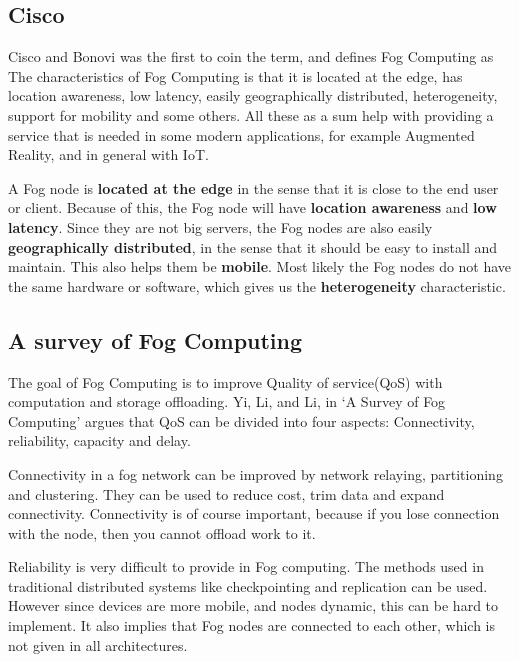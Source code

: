 \subsection{Cisco}
Cisco\cite{bonomi_fog_nodate} and Bonovi was the first to coin the term, and defines Fog Computing as   The characteristics of Fog Computing is that it is located at the edge, has location awareness, low latency, easily geographically distributed, heterogeneity, support for mobility and some others. All these as a sum help with providing a service that is needed in some modern applications, for example Augmented Reality, and in general with IoT.

A Fog node is \textbf{located at the edge} in the sense that it is close to the end user or client. Because of this, the Fog node will have \textbf{location awareness} and \textbf{low latency}. Since they are not big servers, the Fog nodes are also easily \textbf{geographically distributed}, in the sense that it should be easy to install and maintain. This also helps them be \textbf{mobile}. Most likely the Fog nodes do not have the same hardware or software, which gives us the \textbf{heterogeneity} characteristic. 

\subsection{A survey of Fog Computing}
The goal of Fog Computing is to improve Quality of service(QoS) with computation and storage offloading. Yi, Li, and Li, in ‘A Survey of Fog Computing’\cite{yi_survey_2015} argues that QoS can be divided into four aspects: Connectivity, reliability, capacity and delay.

Connectivity in a fog network can be improved by network relaying, partitioning and clustering. They can be used to reduce cost, trim data and expand connectivity. Connectivity is of course important, because if you lose connection with the node, then you cannot offload work to it. 

Reliability is very difficult to provide in Fog computing. The methods used in traditional distributed systems like checkpointing and replication can be used. However since devices are more mobile, and nodes dynamic, this can be hard to implement. It also implies that Fog nodes are connected to each other, which is not given in all architectures. 

